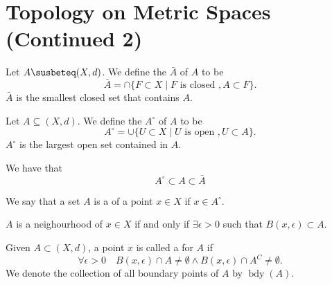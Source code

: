 \documentclass[notoc,notitlepage]{tufte-book}
\DeclareMathOperator{\bdy}{bdy }
\begin{document}
\section{Topology on Metric Spaces (Continued 2)}%
\label{sec:topology_on_metric_spaces_continued_2}

\begin{defn}[Closure]\label{defn:closure}
  Let $A \susbeteq (X, d)$. We define the  $\bar{A}$ of $A$ to be
  \begin{equation*}
    \bar{A} = \cap \{ F \subset X \mid F \text{ is closed }, A \subset F \}.
  \end{equation*}
  $\bar{A}$ is the smallest closed set that contains $A$.
\end{defn}

\begin{defn}[Interior]\label{defn:interior}
  Let $A \subseteq (X, d)$. We define the  $A^\circ$ of $A$ to be
  \begin{equation*}
    A^\circ = \cup \{ U \subset X \mid U \text{ is open }, U \subset A \}.
  \end{equation*}
  $A^\circ$ is the largest open set contained in $A$.
\end{defn}

\begin{remark}
  We have that
  \begin{equation*}
    A^\circ \subset A \subset \bar{A}
  \end{equation*}
\end{remark}

\begin{defn}[Neighbourhood]\label{defn:neighbourhood}
  We say that a set $A$ is a  of a point $x \in X$ if $x \in A^\circ$.
\end{defn}

\begin{note}
  $A$ is a neighourhood of $x \in X$ if and only if $\exists \epsilon > 0$ such that $B(x, \epsilon) \subset A$.
\end{note}

\begin{defn}\label{defn:boundary_point}
  Given $A \subset (X, d)$, a point $x$ is called a  for $A$ if
  \begin{equation*}
    \forall \epsilon > 0 \quad B(x, \epsilon) \cap A \neq \emptyset \land B(x, \epsilon) \cap A^C \neq \emptyset.
  \end{equation*}
  We denote the collection of all boundary points of $A$ by $\bdy(A)$.
\end{defn}
\end{document}
